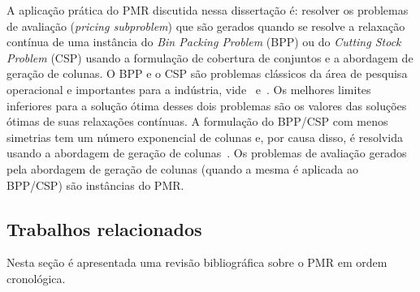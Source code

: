 A aplicação prática do PMR discutida nessa dissertação é: resolver os problemas de avaliação (\emph{pricing subproblem}) que são gerados quando se resolve a relaxação contínua de uma instância do \emph{Bin Packing Problem} (BPP) ou do \emph{Cutting Stock Problem} (CSP) usando a formulação de cobertura de conjuntos e a abordagem de geração de colunas.
O BPP e o CSP são problemas clássicos da área de pesquisa operacional e importantes para a indústria, vide~\cite{survey2014} e~\cite{gg-61,gg-63}.
Os melhores limites inferiores para a solução ótima desses dois problemas são os valores das soluções ótimas de suas relaxações contínuas.
A formulação do BPP/CSP com menos simetrias tem um número exponencial de colunas e, por causa disso, é resolvida usando a abordagem de geração de colunas~\cite{gg-61}.
Os problemas de avaliação gerados pela abordagem de geração de colunas (quando a mesma é aplicada ao BPP/CSP) são instâncias do PMR.

\subsection{Trabalhos relacionados}

Nesta seção é apresentada uma revisão bibliográfica sobre o PMR em ordem cronológica.


